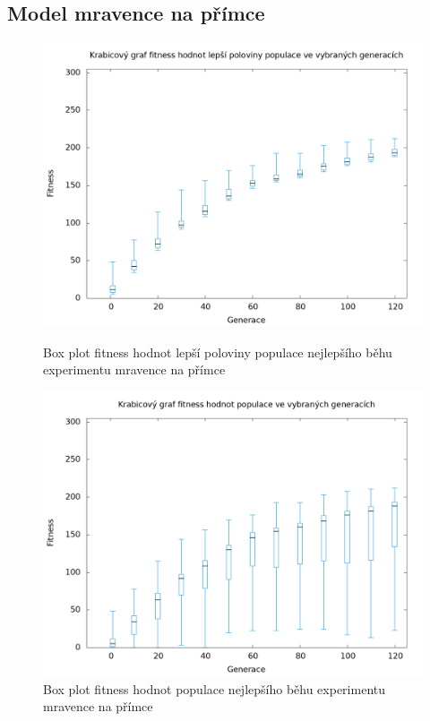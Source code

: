 \clearpage


\subsection{Model mravence na přímce}

\begin{figure}[h]
    \begin{minipage}[c]{0.48\linewidth}
        \includegraphics[width=\linewidth]{obrazky/bar_whisker_mravenec_primka_top50.png}
        \caption{Box plot fitness hodnot lepší poloviny populace nejlepšího běhu experimentu mravence na přímce}

    \end{minipage}
    \hfill
    \begin{minipage}[c]{0.48\linewidth}
        \includegraphics[width=\linewidth]{obrazky/bar_whisker_mravenec_primka.png}
        \caption{Box plot fitness hodnot populace nejlepšího běhu experimentu mravence na přímce}
    \end{minipage}
\end{figure}

